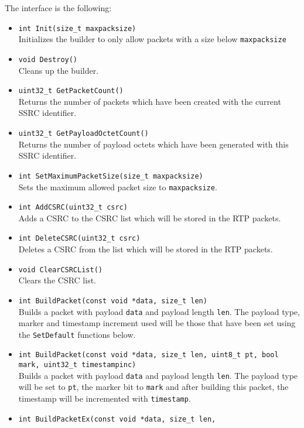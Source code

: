 \documentclass[12pt,a4paper]{article}
\begin{document}
				The interface is the following:
				\begin{itemize}
					\item {\tt int Init(size\_t maxpacksize)}\\
						Initializes the builder to only allow packets with a size
						below {\tt maxpacksize}
					\item {\tt void Destroy()}\\
						Cleans up the builder.
					\item {\tt uint32\_t GetPacketCount()}\\
						Returns the number of packets which have been created with
						the current SSRC identifier.
					\item {\tt uint32\_t GetPayloadOctetCount()}\\
						Returns the number of payload octets which have been generated
						with this SSRC identifier.
					\item {\tt int SetMaximumPacketSize(size\_t maxpacksize)}\\
						Sets the maximum allowed packet size to {\tt maxpacksize}.
					\item {\tt int AddCSRC(uint32\_t csrc)}\\
						Adds a CSRC to the CSRC list which will be stored in the
						RTP packets.
					\item {\tt int DeleteCSRC(uint32\_t csrc)}\\
						Deletes a CSRC from the list which will be stored in the
						RTP packets.
					\item {\tt void ClearCSRCList()}\\
						Clears the CSRC list.
					\item {\tt int BuildPacket(const void *data, size\_t len)}\\
						Builds a packet with payload {\tt data} and payload length
						{\tt len}. The payload type, marker and timestamp increment
						used will be those that have been set using the 
						{\tt SetDefault} functions below.
					\item {\tt int BuildPacket(const void *data, size\_t len,
					                           uint8\_t pt, bool mark, uint32\_t timestampinc)}\\
						Builds a packet with payload {\tt data} and payload length
						{\tt len}. The payload type will be set to {\tt pt}, the
						marker bit to {\tt mark} and after building this packet,
						the timestamp will be incremented with {\tt timestamp}.
					\item {\tt int BuildPacketEx(const void *data, size\_t len,
}
\end{itemize}
\end{document}
